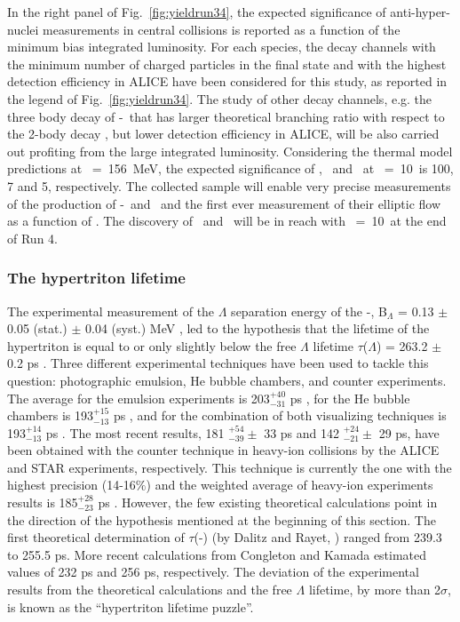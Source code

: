 In the right panel of Fig.~\ref{fig:yieldrun34}, the expected significance of anti-hyper-nuclei measurements in central \PbPb collisions is reported as a function of the minimum bias integrated luminosity. 
For each species, the decay channels with the minimum number of charged particles in the final state and with the highest detection efficiency in ALICE have been considered for this study, as reported in the legend of Fig.~\ref{fig:yieldrun34}. 
The study of other decay channels, e.g. the three body decay of \hyp\ that has larger theoretical branching ratio with respect to the 2-body decay \cite{ Phys.Rev.C57}, but lower detection efficiency in ALICE, will be also carried out profiting from the large integrated luminosity.
Considering the thermal model predictions at \Tchem~=~156~MeV, the expected significance of \antihyp, \antihypfour\ and \antihehypfour\ at \Lint~=~10~\nbInv is 100, 7 and 5, respectively. 
The collected sample will enable very precise measurements of the production of \hyp\ and \antihyp\ and the first ever measurement of their elliptic flow as a function of \pT.
The discovery of \antihypfour\ and \antihehypfour\ will be in reach with \Lint~=~10~\nbInv at the end of Run 4.

\subsubsection{The hypertriton lifetime}
The experimental measurement of the $\Lambda$ separation energy of the \hyp, B$_{\Lambda}$ = 0.13 $\pm$ 0.05 (stat.) $\pm$ 0.04 (syst.) MeV \cite{davis20053}, led to the hypothesis that the lifetime of the hypertriton is equal to or only slightly below the free $\Lambda$ lifetime $\tau$($\Lambda$) = 263.2 $\pm$ 0.2 ps \cite{pdg:2018}.
Three different experimental techniques have been used to tackle this question: photographic emulsion, He bubble chambers, and counter experiments. The average for the emulsion experiments is 203$^{+40}_{-31}$ ps \cite{agnello:2016}, for the He bubble chambers is 193$^{+15}_{-13}$ ps \cite{agnello:2016}, and for the combination of both visualizing techniques is 193$^{+14}_{-13}$ ps \cite{agnello:2016}. The most recent results, 181 $^{+54}_{-39} \pm$ 33 ps and 142 $^{+24}_{-21} \pm$ 29 ps, have been obtained with the counter technique in heavy-ion collisions by the ALICE \cite{PhysLettB.754.360} and STAR \cite{PhysRevC.97.054909} experiments, respectively. This technique is currently the one with the highest precision (14-16$\%$) and the weighted average of heavy-ion experiments results is 185$^{+28}_{-23}$ ps \cite{agnello:2016}.
However, the few existing theoretical calculations point in the direction of the hypothesis mentioned at the beginning of this section. 
The first theoretical determination of $\tau$(\hyp) (by Dalitz and Rayet, \cite{NuovCim.A46}) ranged from 239.3 to 255.5 ps. More recent calculations from Congleton \cite{jphysg.18.339} and Kamada \cite{Phys.Rev.C57} estimated values of 232 ps and 256 ps, respectively. The deviation of the experimental results from the theoretical calculations and the free $\Lambda$ lifetime, by more than 2$\sigma$, is known as the ``hypertriton lifetime puzzle''.
 
